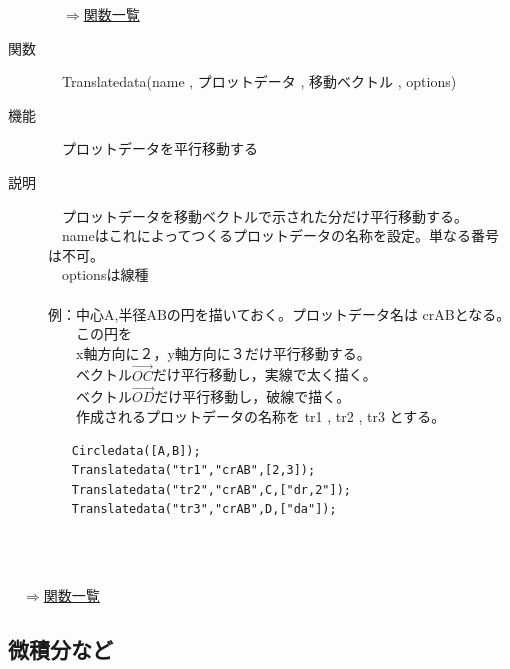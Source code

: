\documentclass[papersize,a4paper,12pt,uplatex]{jsarticle}
\begin{document}
\begin{description}
\begin{flushright}　\hyperlink{functionlist}{$\Rightarrow$関数一覧}\end{flushright}
\newpage
\hypertarget{translatedata}{}
\item[関数]　Translatedata(name , プロットデータ , 移動ベクトル , options)
\item[機能]　プロットデータを平行移動する
\item[説明]　プロットデータを移動ベクトルで示された分だけ平行移動する。\\
　nameはこれによってつくるプロットデータの名称を設定。単なる番号は不可。\\
　optionsは線種\\
\\
例：中心A,半径ABの円を描いておく。プロットデータ名は crABとなる。\\
　　この円を\\
　　x軸方向に２，y軸方向に３だけ平行移動する。\\
　　ベクトル$\overrightarrow{OC} $だけ平行移動し，実線で太く描く。\\
　　ベクトル$\overrightarrow{OD} $だけ平行移動し，破線で描く。\\
　　作成されるプロットデータの名称を tr1 , tr2 , tr3 とする。
\begin{verbatim}
　　Circledata([A,B]);
　　Translatedata("tr1","crAB",[2,3]);
　　Translatedata("tr2","crAB",C,["dr,2"]);
　　Translatedata("tr3","crAB",D,["da"]);
\end{verbatim}
　\\
　　　　　　　

\end{description}

\begin{flushright}　\hyperlink{functionlist}{$\Rightarrow$関数一覧}\end{flushright}
\newpage
\subsection{微積分など}
\end{document}
